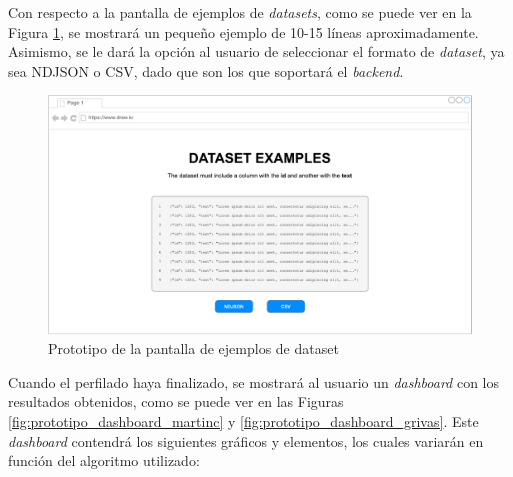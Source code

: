 \bigskip
Con respecto a la pantalla de ejemplos de \textit{datasets}, como se puede ver en la Figura \ref{fig:prototipo_ejemplos_dataset},
se mostrará un pequeño ejemplo de 10-15 líneas aproximadamente. Asimismo, se le dará la opción al usuario de seleccionar el
formato de \textit{dataset}, ya sea NDJSON o CSV, dado que son los que soportará el \textit{backend}.

\bigskip
\begin{figure}[H]
	\centering
	\includegraphics[width=\textwidth]{diagramas/dataset-examples.pdf}
	\caption{Prototipo de la pantalla de ejemplos de dataset}
	\label{fig:prototipo_ejemplos_dataset}
\end{figure}

\bigskip
Cuando el perfilado haya finalizado, se mostrará al usuario un \textit{dashboard} con los resultados obtenidos,
como se puede ver en las Figuras \ref{fig:prototipo_dashboard_martinc} y \ref{fig:prototipo_dashboard_grivas}.
Este \textit{dashboard} contendrá los siguientes gráficos y elementos, los cuales variarán en función del algoritmo utilizado:

